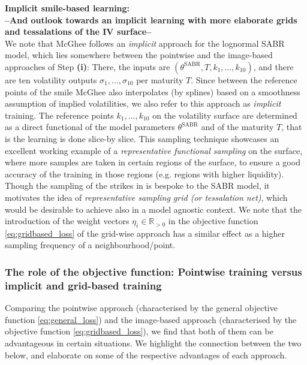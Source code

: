 \documentclass{article}
\theoremstyle{remark}
\begin{document}
\textbf{Implicit smile-based learning: \\
--And outlook towards an implicit learning with more elaborate grids and tessalations of the IV surface--}\\ We note that McGhee \cite{McGhee} follows an \emph{implicit} approach  for the lognormal SABR model, which lies somewhere between the
pointwise and the image-based approaches of Step \textbf{(i)}: There, the inputs
are $(\theta^{\mathrm{SABR}}, T, k_1, \ldots, k_{10})$, and there are ten volatility
outputs ${\sigma_1, \ldots, \sigma_{10}}$ per maturity $T$. 
Since between the reference points of the smile McGhee \cite{McGhee} also interpolates (by splines) based on a smoothness assumption of implied volatilities, we also refer to this approach as \emph{implicit} training.
The reference points $k_1, \ldots, k_{10}$ on the volatility surface are determined as a direct functional of the model parameters $\theta^{\mathrm{SABR}}$ and of the maturity $T$, that is the learning is done slice-by slice. 
This sampling technique showcases an excellent working example of a \emph{representative functional sampling} on the surface, where more samples are taken in certain regions of the surface, to ensure a good accuracy of the training in those regions (e.g. regions with higher liquidity). Though the sampling of the strikes in \cite{McGhee} is bespoke to the SABR model, it motivates the idea of \emph{representative sampling grid (or tessalation net)}, which would be desirable to achieve also in a model agnostic context. We note that the introduction of the weight vectors $\eta_i \in \mathbb{R}_{>0}$ in the objective function \eqref{eq:gridbased_loss} of the grid-wise approach has a similar effect as a higher sampling frequency of a neighbourhood/point.

\subsubsection{The role of the objective function: Pointwise training versus implicit and grid-based training}

Comparing the pointwise approach (characterised by the general objective
function \eqref{eq:general_loss}) and the image-based approach (characterised
by the objective function \eqref{eq:gridbased_loss}), we find that
both of them can be advantageous in certain situations. We highlight the connection between the two below, and
elaborate on some of the respective advantages of each approach.\\
\end{document}

